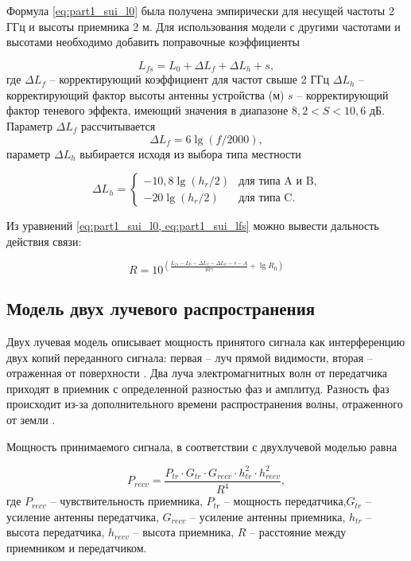 
Формула \cref{eq:part1_sui_l0} была получена эмпирически для несущей частоты 2 ГГц и высоты приемника 2 м. Для использования модели с другими частотами и высотами необходимо добавить поправочные коэффициенты 

\begin{equation}
  \label{eq:part1_sui_lfs}
  L_{fs} = L_0 + \Delta L_f + \Delta L_h + s,
\end{equation}
где $\Delta L_f$ -- корректирующий коэффициент для частот свыше 2 ГГц $\Delta L_h$ --  корректирующий фактор высоты антенны устройства (м) $s$ -- корректирующий фактор теневого эффекта, имеющий значения в диапазоне $8,2 < S < 10,6$ дБ. Параметр $\Delta L_f$ рассчитывается 
$$
\Delta L_f  = 6 \lg{(f / 2000)},
$$
параметр $\Delta L_h$ выбирается исходя из выбора типа местности

$$
\Delta L_h =  
 \begin{cases}
  -10,8 \lg{(h_r/2)} &\text{для типа A и B,}\\
  -20 \lg{(h_r/2)} &\text{для типа C.}
 \end{cases}
$$

Из уравнений \cref{eq:part1_sui_l0, eq:part1_sui_lfs} можно вывести дальность действия связи:

\begin{equation}
  R = 10^{(\frac{L_{fs} - L_0 - \Delta L_f - \Delta L_h - s - A}{10\gamma} + \lg{R_0})}
\end{equation}

\subsection{Модель двух лучевого распространения}

Двух лучевая модель описывает мощность принятого сигнала как интерференцию двух копий переданного сигнала: первая -- луч прямой видимости, вторая -- отраженная от поверхности \cite{Gaitan2020}. 
Два луча электромагнитных волн от передатчика приходят в приемник с определенной разностью фаз и амплитуд. Разность фаз происходит из-за дополнительного времени распространения волны, отраженного от земли \cite{Rademacher2016, Bacco2014, Zochmann2017, Kurt2017}. 


Мощность принимаемого сигнала, в соответствии с двухлучевой моделью равна

\begin{equation}
  \label{eq:part1_two-ray_model_prcev}
  P_{recv} = \frac{P_{tr} \cdot G_{tr} \cdot G_{recv} \cdot h^2_{tr} \cdot h^2_{recv}}{R^4},
\end{equation}
где $P_{recv}$ -- чувствительность приемника, $P_{tr}$ -- мощность передатчика,$G_{tr}$ -- усиление антенны передатчика, $G_{recv}$ -- усиление антенны приемника, $h_{tr}$ -- высота передатчика, $h_{recv}$ -- высота приемника, $R$ -- расстояние между приемником и передатчиком.

